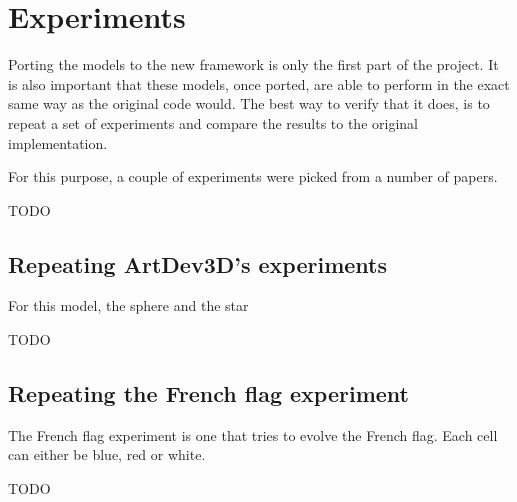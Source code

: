 \section{Experiments}
\label{sec:experiments}
Porting the models to the new framework is only the first part of the project. It is also important that these models, once ported, are able to perform in the exact same way as the original code would. The best way to verify that it does, is to repeat a set of experiments and compare the results to the original implementation.

For this purpose, a couple of experiments were picked from a number of papers.

TODO

\subsection{Repeating ArtDev3D's experiments}
For this model, the sphere and the star

TODO



\subsection{Repeating the French flag experiment}
The French flag experiment is one that tries to evolve the French flag. Each cell can either be blue, red or white.


TODO

